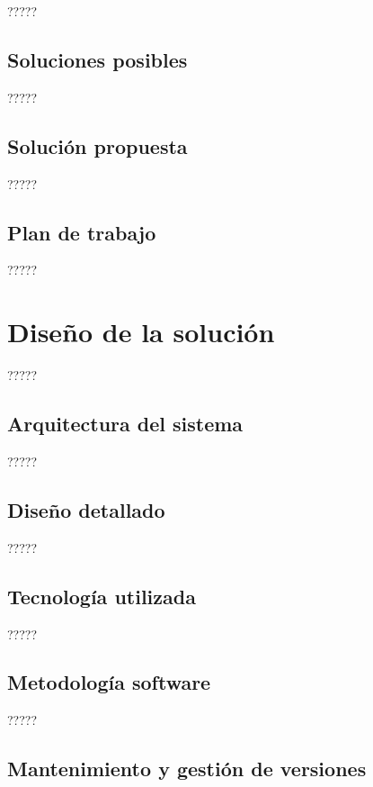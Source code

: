 \documentclass[11pt,spanish,listoffigures]{tfgetsinf}
\begin{document}
?????

\section{Soluciones posibles}

?????

\section{Solución propuesta}

?????

\section{Plan de trabajo}

?????


\chapter{Diseño de la solución}

?????

\section{Arquitectura del sistema}

?????

\section{Diseño detallado}

?????

\section{Tecnología utilizada}

?????

\section{Metodología software}

?????

\section{Mantenimiento y gestión de versiones}
\end{document}

